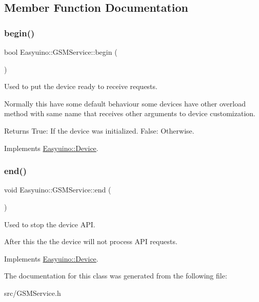 \subsection{Member Function Documentation}
\mbox{\label{class_easyuino_1_1_g_s_m_service_aeafc2dae47e4b13e127eb228a0f7ff6a}} 
\subsubsection{\texorpdfstring{begin()}{begin()}}
{\footnotesize\ttfamily bool Easyuino\+::\+G\+S\+M\+Service\+::begin (\begin{DoxyParamCaption}{ }\end{DoxyParamCaption})\hspace{0.3cm}{\ttfamily [virtual]}}



Used to put the device ready to receive requests. 

Normally this have some default behaviour some devices have other overload method with same name that receives other arguments to device customization. \begin{DoxyReturn}{Returns}
True\+: If the device was initialized. False\+: Otherwise. 
\end{DoxyReturn}


Implements \hyperlink{class_easyuino_1_1_device_a2e7bb2fec849719a9d9432b57cdb72ba}{Easyuino\+::\+Device}.

\mbox{\label{class_easyuino_1_1_g_s_m_service_a05bef783773776ec209608aa81d1ff45}} 
\subsubsection{\texorpdfstring{end()}{end()}}
{\footnotesize\ttfamily void Easyuino\+::\+G\+S\+M\+Service\+::end (\begin{DoxyParamCaption}{ }\end{DoxyParamCaption})\hspace{0.3cm}{\ttfamily [virtual]}}



Used to stop the device A\+PI. 

After this the the device will not process A\+PI requests. 

Implements \hyperlink{class_easyuino_1_1_device_ab31018ef64adc84aa2ea575b2297548f}{Easyuino\+::\+Device}.



The documentation for this class was generated from the following file\+:\begin{DoxyCompactItemize}
\item 
src/G\+S\+M\+Service.\+h\end{DoxyCompactItemize}
